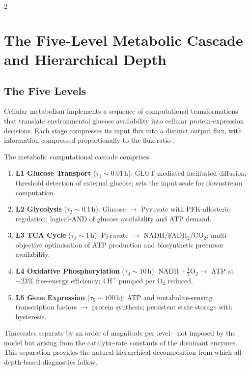 \begin{multicols}{2}

\section{The Five-Level Metabolic Cascade and Hierarchical Depth}
\label{sec:ch08-cascade}

\subsection{The Five Levels}

Cellular metabolism implements a sequence of computational transformations that translate environmental glucose availability into cellular protein-expression decisions. Each stage compresses its input flux into a distinct output flux, with information compressed proportionally to the flux ratio \citep{newgard2017, halestrap2013, wallace2013}.

\begin{definition}
\label{def:ch08-cascade}
The metabolic computational cascade comprises:
\begin{enumerate}[leftmargin=*, noitemsep]
\item \textbf{L1 Glucose Transport} ($\tau_1 \sim 0.01$\,h): GLUT-mediated facilitated diffusion; threshold detection of external glucose; sets the input scale for downstream computation.
\item \textbf{L2 Glycolysis} ($\tau_2 \sim 0.1$\,h): Glucose $\to$ Pyruvate with PFK-allosteric regulation; logical-AND of glucose availability and ATP demand.
\item \textbf{L3 TCA Cycle} ($\tau_3 \sim 1$\,h): Pyruvate $\to$ NADH/FADH$_2$/CO$_2$; multi-objective optimisation of ATP production and biosynthetic precursor availability.
\item \textbf{L4 Oxidative Phosphorylation} ($\tau_4 \sim 10$\,h): NADH $+ \frac{1}{2}\mathrm{O}_2 \to$ ATP at $\sim 23\%$ free-energy efficiency; $4\,\mathrm{H}^+$ pumped per $\mathrm{O}_2$ reduced.
\item \textbf{L5 Gene Expression} ($\tau_5 \sim 100$\,h): ATP and metabolite-sensing transcription factors $\to$ protein synthesis; persistent state storage with hysteresis.
\end{enumerate}
\end{definition}

Timescales separate by an order of magnitude per level---not imposed by the model but arising from the catalytic-rate constants of the dominant enzymes. This separation provides the natural hierarchical decomposition from which all depth-based diagnostics follow.


\end{multicols}
